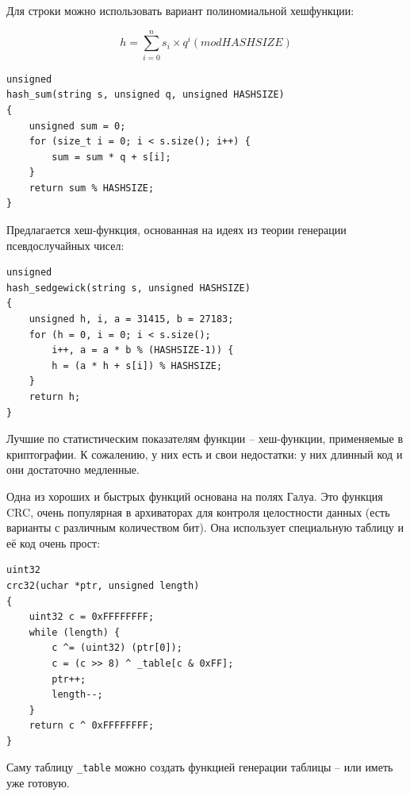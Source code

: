 \documentclass{beamer}
\begin{document}
\begin{frame}[t, fragile]
    Для строки можно использовать вариант полиномиальной хешфункции:

    \[h=\sum_{i=0}^{n} s_i \times q^i (mod HASHSIZE)\]
    
    \begin{verbatim}
unsigned
hash_sum(string s, unsigned q, unsigned HASHSIZE)
{
    unsigned sum = 0;
    for (size_t i = 0; i < s.size(); i++) {
        sum = sum * q + s[i];
    }
    return sum % HASHSIZE;
}
    \end{verbatim}
\end{frame}

\begin{frame}[t, fragile]
    Предлагается хеш-функция, основанная на идеях из теории генерации псевдослучайных чисел:
    \begin{verbatim}
unsigned
hash_sedgewick(string s, unsigned HASHSIZE)
{
    unsigned h, i, a = 31415, b = 27183;
    for (h = 0, i = 0; i < s.size();
        i++, a = a * b % (HASHSIZE-1)) {
        h = (a * h + s[i]) % HASHSIZE;
    }
    return h;
}
    \end{verbatim}
    
    Лучшие по статистическим показателям функции -- хеш-функции, применяемые в криптографии. К сожалению, у них есть и свои недостатки: у них длинный код и они достаточно медленные.
\end{frame}

\begin{frame}[t, fragile]
    Одна из хороших и быстрых функций основана на полях Галуа. Это функция CRC, очень популярная в архиваторах для контроля целостности данных (есть варианты с различным количеством бит). Она использует специальную таблицу  и её код очень прост:
    
    \begin{verbatim}
uint32 
crc32(uchar *ptr, unsigned length)
{
    uint32 c = 0xFFFFFFFF;
    while (length) {
        c ^= (uint32) (ptr[0]);
        c = (c >> 8) ^ _table[c & 0xFF];
        ptr++;
        length--;
    }
    return c ^ 0xFFFFFFFF;
}
    \end{verbatim}
    Саму таблицу \texttt{\_table} можно создать функцией генерации таблицы -- или иметь уже готовую.
\end{frame}
\end{document}

